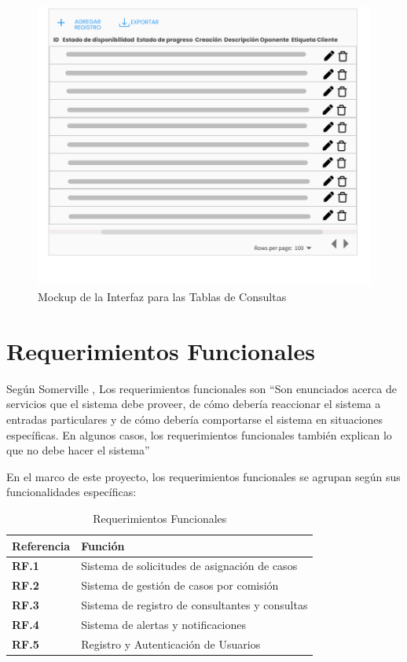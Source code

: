 \begin{figure}[H]
\centering
\includegraphics[width=1\linewidth]{fig/table-comment-gui.png}
\caption{Mockup de la Interfaz para las Tablas de Consultas}
\label{fig:table-consult-gui}
\end{figure}



\section{Requerimientos Funcionales}
Según Somerville \cite{Somerville}, Los requerimientos funcionales son ``Son enunciados acerca de servicios que el sistema
debe proveer, de cómo debería reaccionar el sistema a entradas particulares y de cómo debería comportarse el sistema en situaciones específicas. En algunos casos, los requerimientos funcionales también explican lo que no debe hacer el sistema''

En el marco de este proyecto, los requerimientos funcionales se agrupan según sus funcionalidades específicas:

\begin{table}[H]
\centering
\begin{tabular}{|l|l|}
\hline
\textbf{Referencia} & \textbf{Función} \\
\hline
\textbf{RF.1} & Sistema de solicitudes de asignación de casos \\
\hline
\textbf{RF.2} & Sistema de gestión de casos por comisión \\
\hline
\textbf{RF.3} & Sistema de registro de consultantes y consultas \\
\hline
\textbf{RF.4} & Sistema de alertas y notificaciones \\
\hline
\textbf{RF.5} & Registro y Autenticación de Usuarios \\
\hline
\end{tabular}
\caption{Requerimientos Funcionales}
\label{tab:rf}
\end{table}



